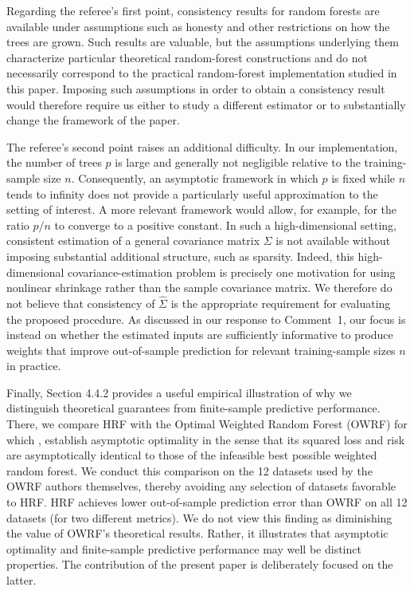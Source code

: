 \documentclass[12pt]{article}
\begin{document}
Regarding the referee's first point, consistency results for random forests are available under assumptions such as honesty and other restrictions on how the trees are grown. Such results are valuable, but the assumptions underlying them characterize particular theoretical random-forest constructions and do not necessarily correspond to the practical random-forest implementation studied in this paper. Imposing such assumptions in order to obtain a consistency result would therefore require us either to study a different estimator or to substantially change the framework of the paper.

The referee's second point raises an additional difficulty. In our implementation, the number of trees $p$ is large and generally not negligible relative to the training-sample size $n$. Consequently, an asymptotic framework in which $p$ is fixed while $n$ tends to infinity does not provide a particularly useful approximation to the setting of interest. A more relevant framework would allow, for example, 
for the ratio $p/n$ to converge to a positive constant. In such a high-dimensional setting, consistent estimation of a general covariance matrix $\Sigma$ is not available without imposing substantial additional structure, such as sparsity.
Indeed, this high-dimensional covariance-estimation problem is precisely one motivation for using nonlinear shrinkage rather than the sample covariance matrix. We therefore do not believe that consistency of $\hat{\Sigma}$ is the appropriate requirement for evaluating the proposed procedure. As discussed in our response to Comment~1, our focus is instead on whether the estimated inputs are sufficiently informative to produce weights that improve out-of-sample prediction
for relevant training-sample sizes $n$ in practice. 

Finally, Section 4.4.2 provides a useful empirical illustration of why we distinguish theoretical guarantees from finite-sample predictive performance. There, we compare HRF with 
the Optimal Weighted Random Forest (OWRF) for which 
\cite{chen:yu:zhang:2024},
establish asymptotic optimality in the sense that its squared loss and risk are asymptotically identical to those of the infeasible best possible weighted random forest.
We conduct this comparison on the 12 datasets used by the OWRF authors themselves, thereby avoiding any selection of datasets favorable to HRF. HRF achieves lower out-of-sample prediction error than OWRF on all 12 datasets (for two different metrics). 
We do not view this finding as diminishing the value of OWRF's theoretical results. Rather, it illustrates that asymptotic optimality and finite-sample predictive performance may well be distinct properties. The contribution of the present paper is deliberately focused on the latter. 
\end{document}
